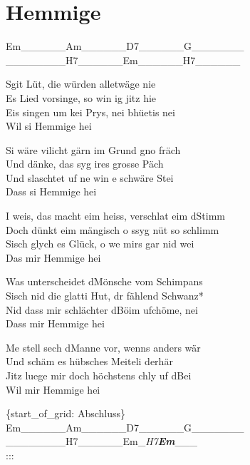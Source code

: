 \documentclass[
  letterpaper,
]{scrbook}
\begin{document}
\hypertarget{hemmige}{%
\chapter{Hemmige}\label{hemmige}}

\textbar Em\_\_\_\_\_\_\textbar Am\_\_\_\_\_\_\textbar D7\_\_\_\_\_\_\textbar G\_\_\_\_\_\_\_\textbar{}\\
\textbar\_\_\_\_\_\_\_\_\textbar H7\_\_\_\_\_\_\textbar Em\_\_\_\_\_\_\textbar H7\_\_\_\_\_\_\textbar{}

S\textquotesingle git Lüt, die würden alletwäge nie\\
Es Lied vorsinge, so win ig jitz hie\\
Eis singen um kei Prys, nei bhüetis nei\\
Wil si Hemmige hei

Si wäre vilicht gärn im Grund gno fräch\\
Und dänke, das syg ires grosse Päch\\
Und s\textquotesingle laschtet uf ne win e schwäre Stei\\
Dass si Hemmige hei

I weis, das macht eim heiss, verschlat eim d\textquotesingle Stimm\\
Doch dünkt eim mängisch o s\textquotesingle syg nüt so schlimm\\
S\textquotesingle isch glych es Glück, o we mirs gar nid wei\\
Das mir Hemmige hei

Was unterscheidet d\textquotesingle Mönsche vom Schimpans\\
S\textquotesingle isch nid die glatti Hut, dr fählend Schwanz*\\
Nid dass mir schlächter d\textquotesingle Böim ufchöme, nei\\
Dass mir Hemmige hei

Me stell sech d\textquotesingle Manne vor, wenns anders wär\\
Und s\textquotesingle chäm es hübsches Meiteli derhär\\
Jitz luege mir doch höchstens chly uf d\textquotesingle Bei\\
Wil mir Hemmige hei

\{start\_of\_grid: Abschluss\}\\
\textbar Em\_\_\_\_\_\_\textbar Am\_\_\_\_\_\_\textbar D7\_\_\_\_\_\_\textbar G\_\_\_\_\_\_\_\textbar{}\\
\textbar\_\_\_\_\_\_\_\_\textbar H7\_\_\_\_\_\_\textbar Em\_\emph{H7\textbf{\textbar Em}}\_\_\_\textbar{}\\
:::
\end{document}
